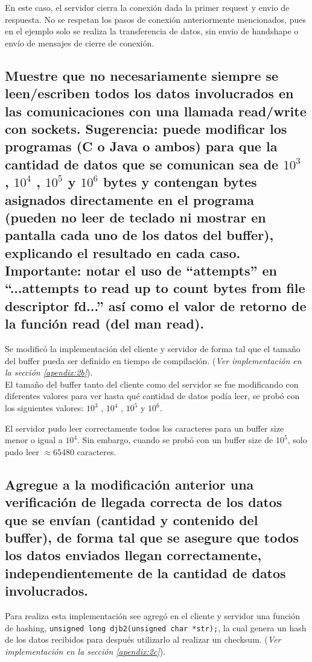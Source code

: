 \documentclass[osajnl,twocolumn,showpacs,superscriptaddress,10pt]{revtex4-1} %
\begin{document}
En este caso, el servidor cierra la conexión dada la primer request y envio de respuesta. No se respetan los pasos de conexión anteriormente mencionados, pues en el ejemplo solo se realiza la transferencia de datos, sin envio de handshape o envío de mensajes de cierre de conexión.

\subsection{Muestre que no necesariamente siempre se leen/escriben todos los datos involucrados en las comunicaciones con una llamada read/write con sockets. Sugerencia: puede modificar los programas (C o Java o ambos) para que la cantidad de datos que se comunican sea de $10^3$ , $10^4$ , $10^5$ y $10^6$ bytes y contengan bytes asignados directamente en el programa (pueden no leer de teclado ni mostrar en pantalla cada uno de los datos del buffer), explicando el resultado en cada caso. Importante: notar el uso de “attempts” en “...attempts to read up to count bytes from file descriptor fd...” así como el valor de retorno de la función read (del man read).}

Se modificó la implementación del cliente y servidor de forma tal que el tamaño del buffer pueda ser definido en tiempo de compilación. (\textit{Ver implementación en la sección \ref{apendix:2b}}). \\

El tamaño del buffer tanto del cliente como del servidor se fue modificando con diferentes valores para ver hasta qué cantidad de datos podía leer, se probó con los siguientes valores: $10^3$ , $10^4$ , $10^5$ y $10^6$.

El servidor pudo leer correctamente todos los caracteres para un buffer size menor o igual a $10^4$. Sin embargo, cuando se probó con un buffer size de $10^5$, solo pudo leer $\approx 65480$ caracteres.

\subsection{Agregue a la modificación anterior una verificación de llegada correcta de los datos que se envían (cantidad y contenido del buffer), de forma tal que se asegure que todos los datos enviados llegan correctamente, independientemente de la cantidad de datos involucrados.}

Para realiza esta implementación see agregó en el cliente y servidor una función de hashing, \texttt{unsigned long djb2(unsigned char *str);}, la cual genera un hash de los datos recibidos para después utilizarlo al realizar un checksum. (\textit{Ver implementación en la sección \ref{apendix:2c}}).
\end{document}
